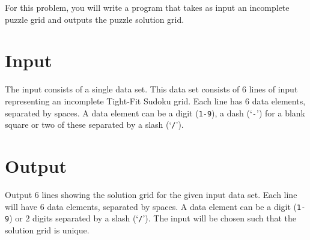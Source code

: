 For this problem, you will write a program that takes as input an incomplete puzzle grid and outputs
the puzzle solution grid.

\section*{Input}

The input consists of a single data set.
This data set consists of $6$ lines of input
representing an incomplete Tight-Fit Sudoku grid. 
Each line has $6$ data elements, separated by spaces. 
A data element can be a digit (\texttt{1-9}), a dash (`\texttt{-}') 
for a blank square or two of these separated by a slash (`\texttt{/}').

\section*{Output}

Output $6$ lines showing the solution grid for the given input data set. Each line
will have $6$ data elements, separated by spaces. A data element can be a digit (\texttt{1-9}) 
or $2$ digits separated by a slash (`\texttt{/}').
The input will be chosen such that the solution grid is unique.
